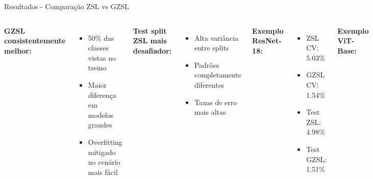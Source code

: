 \begin{frame}{Resultados - Comparação ZSL vs GZSL}
\begin{columns}
\textbf{GZSL consistentemente melhor:}
\begin{itemize}
    \item 50\% das classes vistas no treino
    \item Maior diferença em modelos grandes
    \item Overfitting mitigado no cenário mais fácil
\end{itemize}

\textbf{Test split ZSL mais desafiador:}
\begin{itemize}
    \item Alta variância entre splits
    \item Padrões completamente diferentes
    \item Taxas de erro mais altas
\end{itemize}

\textbf{Exemplo ResNet-18:}
\begin{itemize}
    \item ZSL CV: 5.03\%
    \item GZSL CV: 1.54\%
    \item Test ZSL: 4.98\%
    \item Test GZSL: 1.51\%
\end{itemize}

\vspace{0.5cm}
\textbf{Exemplo ViT-Base:}
\begin{itemize}
    \item ZSL CV: 12.43\%
    \item GZSL CV: 7.97\%
    \item Test ZSL: 19.72\%
    \item Test GZSL: 5.19\%
\end{itemize}
\end{columns}
\end{frame}

